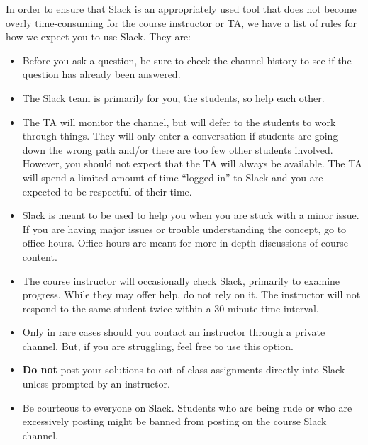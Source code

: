 \documentclass[oneside,letterpaper,11pt]{exam}
\begin{document}
{\noindent In order to ensure that Slack is an appropriately used tool that does not become overly time-consuming for the course instructor or TA, we have a list of rules for how we expect you to use Slack. They are:}
\begin{itemize}
\item[1.] Before you ask a question, be sure to check the channel history to see if the question has already been answered.\\[-15pt]
\item[2.] The Slack team is primarily for you, the students, so help each other.\\[-15pt]
\item[3.] The TA will monitor the channel, but will defer to the students to work through things. They will only enter a conversation if students are going down the wrong path and/or there are too few other students involved. However, you should not expect that the TA will always be available. The TA will spend a limited amount of time ``logged in'' to Slack and you are expected to be respectful of their time.\\[-15pt]
\item[4.] Slack is meant to be used to help you when you are stuck with a minor issue. If you are having major issues or trouble understanding the concept, go to office hours. Office hours are meant for more in-depth discussions of course content.
\\[-15pt]
\item[5.] The course instructor will occasionally check Slack, primarily to examine progress. While they may offer help, do not rely on it. The instructor will not respond to the same student twice within a 30 minute time interval.\\[-15pt]
\item[6.] Only in rare cases should you contact an instructor through a private channel. But, if you are struggling, feel free to use this option.\\[-15pt]
\item[7.] \textbf{Do not} post your solutions to out-of-class assignments directly into Slack unless prompted by an instructor.\\[-15pt]
\item[8.] Be courteous to everyone on Slack. Students who are being rude or who are excessively posting might be banned from posting on the course Slack channel.
\end{itemize}
\end{document}
